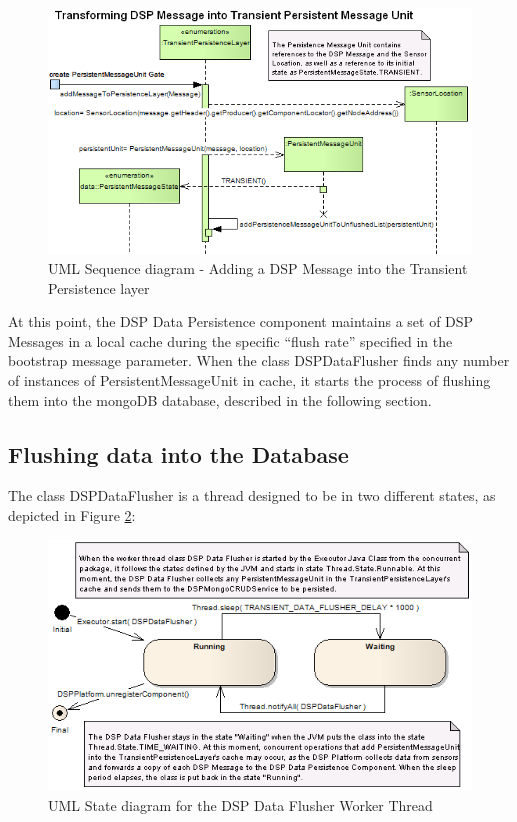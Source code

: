 \begin{figure}[!b]
  \centering
  \includegraphics[scale=0.65]{../diagrams/From-Create-PersistentMessageUnit-to-TransientPersistence-Layer-Sequence}
  \caption{UML Sequence diagram - Adding a DSP Message into the Transient Persistence layer}
  \label{fig:From-Create-PersistentMessageUnit-to-TransientPersistence-Layer-Sequence}
\end{figure}

At this point, the DSP Data Persistence component maintains a set of DSP
Messages in a local cache during the specific ``flush rate'' specified in
the bootstrap message parameter. When the class DSPDataFlusher finds any number
of instances of PersistentMessageUnit in cache, it starts the process of
flushing them into the mongoDB database, described in the following section.

\subsection{Flushing data into the Database}

The class DSPDataFlusher is a thread designed to be in two different states, as
depicted in Figure \ref{fig:DSP-DataPersistence-Flusher-State-Diagram}:

\begin{figure}[!h]
  \centering
  \includegraphics[scale=0.65]{../diagrams/DSP-DataPersistence-Flusher-State-Diagram}
  \caption{UML State diagram for the DSP Data Flusher Worker Thread}
  \label{fig:DSP-DataPersistence-Flusher-State-Diagram}
\end{figure}

